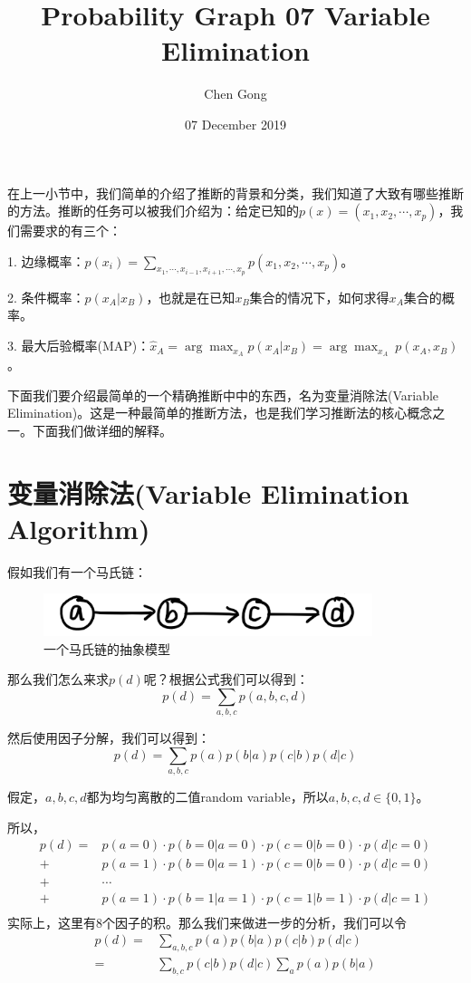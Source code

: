 \documentclass[a4paper]{article}
\title{Probability Graph 07 Variable Elimination}
\author{Chen Gong}
\date{07 December 2019}
\begin{document}
\maketitle
在上一小节中，我们简单的介绍了推断的背景和分类，我们知道了大致有哪些推断的方法。推断的任务可以被我们介绍为：给定已知的$p(x) = (x_1,x_2,\cdots,x_p)$，我们需要求的有三个：

1. 边缘概率：$p(x_i) = \sum_{x_1,\cdots,x_{i-1},x_{i+1},\cdots,x_p}p(x_1,x_2,\cdots,x_p)$。

2. 条件概率：$p(x_A|x_B)$，也就是在已知$x_B$集合的情况下，如何求得$x_A$集合的概率。

3. 最大后验概率(MAP)：$\hat{x}_A=\arg\max_{x_A}p(x_A|x_B) = \arg\max_{x_A}\ p(x_A,x_B)$。

下面我们要介绍最简单的一个精确推断中中的东西，名为变量消除法(Variable Elimination)。这是一种最简单的推断方法，也是我们学习推断法的核心概念之一。下面我们做详细的解释。

\section{变量消除法(Variable Elimination Algorithm)}
假如我们有一个马氏链：
\begin{figure}[H]
    \centering
    \includegraphics[width=.45\textwidth]{微信图片_20191207173240.png}
    \caption{一个马氏链的抽象模型}
    \label{fig:my_label_1}
\end{figure}

那么我们怎么来求$p(d)$呢？根据公式我们可以得到：
\begin{equation}
    p(d) = \sum_{a,b,c}p(a,b,c,d)
\end{equation}

然后使用因子分解，我们可以得到：
\begin{equation}
    p(d) = \sum_{a,b,c}p(a)p(b|a)p(c|b)p(d|c)
\end{equation}

假定，$a,b,c,d$都为均匀离散的二值random variable，所以$a,b,c,d\in \{0,1\}$。

所以，
\begin{equation}
    \begin{split}
        p(d) = & p(a=0)\cdot p(b=0|a=0) \cdot p(c=0|b=0) \cdot p(d|c=0) \\
        + & p(a=1)\cdot p(b=0|a=1) \cdot p(c=0|b=0) \cdot p(d|c=0) \\
        + & \cdots \\
        + & p(a=1)\cdot p(b=1|a=1) \cdot p(c=1|b=1) \cdot p(d|c=1) \\
    \end{split}
\end{equation}
实际上，这里有8个因子的积。那么我们来做进一步的分析，我们可以令
\begin{equation}
    \begin{split}
        p(d) 
        = & \sum_{a,b,c}p(a)p(b|a)p(c|b)p(d|c) \\
        = & \sum_{b,c}p(c|b)p(d|c)\sum_a p(a)p(b|a)
    \end{split}
\end{equation}
\end{document}
